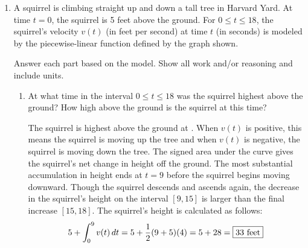 \documentclass{article}
\begin{document}
\begin{enumerate}
\item 
\begin{problem}
    A squirrel is climbing straight up and down a tall tree in Harvard Yard. At time $t=0$, the squirrel is 5 feet above the ground. For $0\leq t\leq 18$, the squirrel's velocity $v(t)$ (in feet per second) at time $t$ (in seconds) is modeled by the piecewise-linear function defined by the graph shown.   
\vspace{-6pt}
\begin{center}
  \end{center}
  Answer each part based on the model. Show all work and/or reasoning and include units.
 \end{problem}

\begin{enumerate}

    \item 
    \begin{problem}
        At what time in the interval $0\leq t \leq 18$ was the squirrel highest above the ground? How high above the ground is the squirrel at this time? 
    \end{problem}
    
\begin{solution}
    The squirrel is highest above the ground at . When $v(t)$ is positive, this means the squirrel is moving up the tree and when $v(t)$ is negative, the squirrel is moving down the tree. The signed area under the curve gives the squirrel's net change in height off the ground. The most substantial accumulation in height ends at $t=9$ before the squirrel begins moving downward. Though the squirrel descends and ascends again, the decrease in the squirrel's height on the interval $[9, 15]$ is larger than the final increase $[15, 18]$. The squirrel's height is calculated as follows:
    \[5+\int_0^9 v(t)\, dt = 5+\frac{1}{2}(9+5)(4) = 5+28=\fbox{$33$ feet}\]
\end{solution}
    

\end{enumerate}
\end{enumerate}
\end{document}
